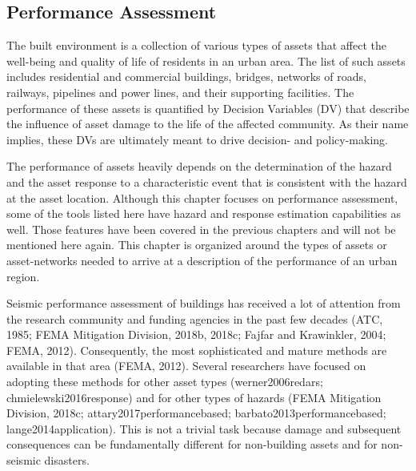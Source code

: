 
\begin{partbacktext}
\part{Performance Assessment}\label{part:Performance}

The built environment is a collection of various types of assets that affect the well-being and quality of life of residents in an urban area. The list of such assets includes residential and commercial buildings, bridges, networks of roads, railways, pipelines and power lines, and their supporting facilities. The performance of these assets is quantified by Decision Variables (DV) that describe the influence of asset damage to the life of the affected community. As their name implies, these DVs are ultimately meant to drive decision- and policy-making.

The performance of assets heavily depends on the determination of the hazard and the asset response to a characteristic event that is consistent with the hazard at the asset location. Although this chapter focuses on performance assessment, some of the tools listed here have hazard and response estimation capabilities as well. Those features have been covered in the previous chapters and will not be mentioned here again. This chapter is organized around the types of assets or asset-networks needed to arrive at a description of the performance of an urban region. 

Seismic performance assessment of buildings has received a lot of attention from the research community and funding agencies in the past few decades (ATC, 1985; FEMA Mitigation Division, 2018b, 2018c; Fajfar and Krawinkler, 2004; FEMA, 2012). Consequently, the most sophisticated and mature methods are available in that area (FEMA, 2012). Several researchers have focused on adopting these methods for other asset types (werner2006redars; chmielewski2016response) and for other types of hazards (FEMA Mitigation Division, 2018c; attary2017performancebased; barbato2013performancebased; lange2014application). This is not a trivial task because damage and subsequent consequences can be fundamentally different for non-building assets and for non-seismic disasters.  

\end{partbacktext}
